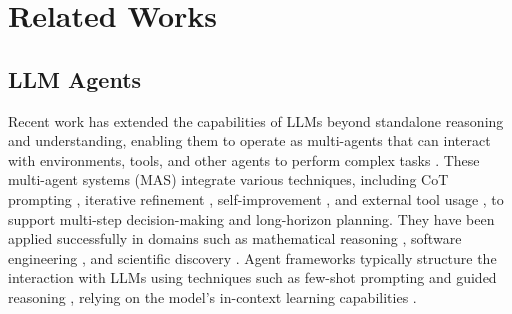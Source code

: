 \section{Related Works}
\subsection{LLM Agents}
Recent work has extended the capabilities of LLMs beyond standalone reasoning and understanding, enabling them to operate as multi-agents that can interact with environments, tools, and other agents to perform complex tasks \citep{wu2023autogen, camel, agentverse, chatdev, xu2025instructagent, xu2025mem, he2025you, le2025instructiontuningcotprompting, 11079788, sym17071087,yu2025gradient,cheng2024optimized,wang2024made, ma2024comparative, song2024u2++}. These multi-agent systems (MAS) integrate various techniques, including CoT prompting \citep{wei2022chain,zhang2024cut}, iterative refinement \citep{shinn2023reflexion}, self-improvement \citep{huang2023large,mei2025omnirouter}, and external tool usage \citep{hao2023toolkengpt, qintoolllm, schick2023toolformer,zhang2025multi,Shi2024,zhu2025llm}, to support multi-step decision-making and long-horizon planning. They have been applied successfully in domains such as mathematical reasoning \citep{agentverse}, software engineering \citep{chatdev, jimenez2023swe, yang2024swe, wang2024opendevin}, and scientific discovery \citep{ai_scientist, agent_laboratory}. Agent frameworks typically structure the interaction with LLMs using techniques such as few-shot prompting \citep{brown2020language, sun2025cross} and guided reasoning \citep{wei2022chain,shinn2023reflexion,Lorasculpt_CVPR25,huang2025keeping,sun2023prompt}, relying on the model’s in-context learning capabilities \citep{olsson2022context,jin2025massive}.

